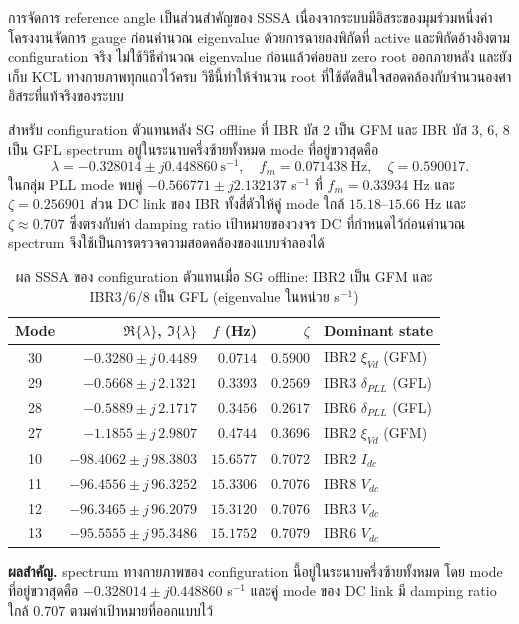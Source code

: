 \documentclass[12pt,a4paper]{article}
\newcommand{\tablefont}{\fontsize{15}{17.2}\selectfont}
\newcommand{\tableheader}{\bfseries}
\newcommand{\resultbox}[1]{\par\addvspace{0.25em}\noindent\textbf{ผลสำคัญ.} #1\par\addvspace{0.25em}}
\begin{document}
การจัดการ reference angle เป็นส่วนสำคัญของ SSSA เนื่องจากระบบมีอิสระของมุมร่วมหนึ่งค่า โครงงานจัดการ gauge ก่อนคำนวณ eigenvalue ด้วยการฉายลงพิกัดที่ active และพิกัดอ้างอิงตาม configuration จริง ไม่ใช้วิธีคำนวณ eigenvalue ก่อนแล้วค่อยลบ zero root ออกภายหลัง และยังเก็บ KCL ทางกายภาพทุกแถวไว้ครบ วิธีนี้ทำให้จำนวน root ที่ใช้ตัดสินใจสอดคล้องกับจำนวนองศาอิสระที่แท้จริงของระบบ

สำหรับ configuration ตัวแทนหลัง SG offline ที่ IBR บัส 2 เป็น GFM และ IBR บัส 3, 6, 8 เป็น GFL spectrum อยู่ในระนาบครึ่งซ้ายทั้งหมด mode ที่อยู่ขวาสุดคือ
\begin{equation}
\lambda=-0.328014\pm j0.448860\ \mathrm{s}^{-1},
\quad f_m=0.071438\ \mathrm{Hz},\quad \zeta=0.590017.
\end{equation}
ในกลุ่ม PLL mode พบคู่ $-0.566771\pm j2.132137$ s$^{-1}$ ที่ $f_m=0.33934$ Hz และ $\zeta=0.256901$ ส่วน DC link ของ IBR ทั้งสี่ตัวให้คู่ mode ใกล้ $15.18$--$15.66$ Hz และ $\zeta\approx0.707$ ซึ่งตรงกับค่า damping ratio เป้าหมายของวงจร DC ที่กำหนดไว้ก่อนคำนวณ spectrum จึงใช้เป็นการตรวจความสอดคล้องของแบบจำลองได้

\begin{table}[H]
\begin{center}
\tablefont
\caption{ผล SSSA ของ configuration ตัวแทนเมื่อ SG offline: IBR2 เป็น GFM และ IBR3/6/8 เป็น GFL (eigenvalue ในหน่วย s$^{-1}$)}
\label{tab:sssa_modes}
\begin{tabular}{@{}c r r r l@{}}
\toprule
\tableheader Mode & \tableheader $\Re\{\lambda\}$, $\Im\{\lambda\}$ & \tableheader $f$ (Hz) & \tableheader $\zeta$ & \tableheader Dominant state \\
\midrule
30 & $-0.3280 \pm j\,0.4489$ & $0.0714$ & $0.5900$ & IBR2 $\xi_{Vd}$ (GFM) \\
29 & $-0.5668 \pm j\,2.1321$ & $0.3393$ & $0.2569$ & IBR3 $\delta_{PLL}$ (GFL) \\
28 & $-0.5889 \pm j\,2.1717$ & $0.3456$ & $0.2617$ & IBR6 $\delta_{PLL}$ (GFL) \\
27 & $-1.1855 \pm j\,2.9807$ & $0.4744$ & $0.3696$ & IBR2 $\xi_{Vd}$ (GFM) \\
10 & $-98.4062 \pm j\,98.3803$ & $15.6577$ & $0.7072$ & IBR2 $I_{dc}$ \\
11 & $-96.4556 \pm j\,96.3252$ & $15.3306$ & $0.7076$ & IBR8 $V_{dc}$ \\
12 & $-96.3465 \pm j\,96.2079$ & $15.3120$ & $0.7076$ & IBR3 $V_{dc}$ \\
13 & $-95.5555 \pm j\,95.3486$ & $15.1752$ & $0.7079$ & IBR6 $V_{dc}$ \\
\bottomrule
\end{tabular}
\end{center}
\end{table}
\resultbox{spectrum ทางกายภาพของ configuration นี้อยู่ในระนาบครึ่งซ้ายทั้งหมด โดย mode ที่อยู่ขวาสุดคือ $-0.328014\pm j0.448860$ s$^{-1}$ และคู่ mode ของ DC link มี damping ratio ใกล้ $0.707$ ตามค่าเป้าหมายที่ออกแบบไว้}
\end{document}

